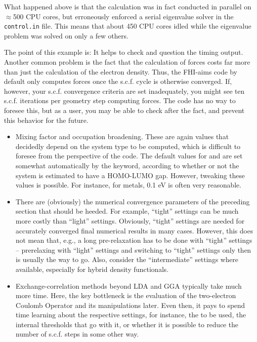 What happened above is that the calculation was in fact conducted in
parallel on $\approx$500 CPU cores, but erroneously enforced a serial
eigenvalue solver in the \texttt{control.in} file. This means that
about 450 CPU cores idled while the 
eigenvalue problem was solved on only a few others. 

The point of this example is: It helps to check and question the
timing output. Another common problem is the fact that the calculation
of forces costs far more than just the calculation of the electron
density. Thus, the FHI-aims code by default only computes forces once
the s.c.f. cycle is otherwise converged. If, however, your
s.c.f. convergence criteria are set inadequately, you might see ten
s.c.f. iterations per geometry step computing forces. The code has no
way to foresee this, but as a user, you may be able to check after the
fact, and prevent this behavior for the future.

\begin{itemize}
  \item Mixing factor and occupation broadening. These are again
    values that decidedly depend on the system type to be computed,
    which is difficult to foresee from the perspective of the
    code. The default values for  and
     are set somewhat automatically by the
     keyword, according to whether or not the
    system is estimated to have a HOMO-LUMO gap. However, tweaking
    these values is possible. For instance, for metals,
     0.1 eV is often very reasonable.
  \item There are (obviously) the numerical convergence parameters of
    the preceding section that should be heeded. For example,
    ``tight'' settings can be much more costly than ``light''
    settings. Obviously, ``tight'' settings are needed for accurately
    converged final numerical results in many cases. However, this
    does not mean that, e.g., a long pre-relaxation has to be done
    with ``tight'' settings -- prerelaxing with ``light'' settings and
    switching to ``tight'' settings only then is usually the way to
    go. Also, consider the ``intermediate'' settings where available,
    especially for hybrid density functionals.
  \item Exchange-correlation methods beyond LDA and GGA typically take
    much more time. Here, the key bottleneck is the evaluation of the
    two-electron Coulomb Operator and its manipulations later. Even
    then, it pays to spend time learning about the respective
    settings, for instance, the  to be used, the
    internal thresholds that go with it, or whether it is possible to
    reduce the number of s.c.f. steps in some other way. 
\end{itemize}
